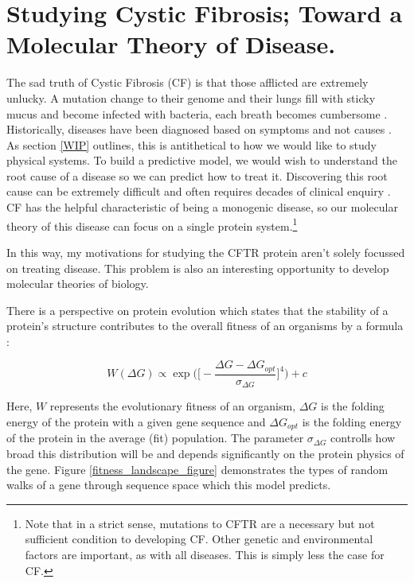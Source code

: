 \section{Studying Cystic Fibrosis; Toward a Molecular Theory of Disease.} 

The sad truth of Cystic Fibrosis (CF) is that those afflicted are extremely unlucky. A mutation change to their genome and their lungs fill with sticky mucus and become infected with bacteria, each breath becomes cumbersome \cite{katkin2022}. Historically, diseases have been diagnosed based on symptoms and not causes \cite{foucault1994}. As section \ref{WIP} outlines, this is antithetical to how we would like to study physical systems. To build a predictive model, we would wish to understand the root cause of a disease so we can predict how to treat it. Discovering this root cause can be extremely difficult and often requires decades of clinical enquiry \cite{dubois2016, tsui2013}. CF has the helpful characteristic of being a monogenic disease, so our molecular theory of this disease can focus on a single protein system.\footnote{Note that in a strict sense, mutations to CFTR are a necessary but not sufficient condition to developing CF. Other genetic and environmental factors are important, as with all diseases. This is simply less the case for CF.}

In this way, my motivations for studying the CFTR protein aren't solely focussed on treating disease. This problem is also an interesting opportunity to develop molecular theories of biology. 

There is a perspective on protein evolution which states that the stability of a protein's structure contributes to the overall fitness of an organisms by a formula \cite{depristo2005}:

\begin{equation}
	\label{fitness_equation}
	W(\Delta G) \propto \exp\bigg(\bigg[-\frac{\Delta G - \Delta G_{opt}}{\sigma_{\Delta G}}\bigg]^4\bigg) + c
\end{equation}

Here, $W$ represents the evolutionary fitness of an organism, $\Delta G$ is the folding energy of the protein with a given gene sequence and $\Delta G_{opt}$ is the folding energy of the protein in the average (fit) population. The parameter $\sigma_{\Delta G}$ controlls how broad this distribution will be and depends significantly on the protein physics of the gene. Figure \ref{fitness_landscape_figure} demonstrates the types of random walks of a gene through sequence space which this model predicts. 

